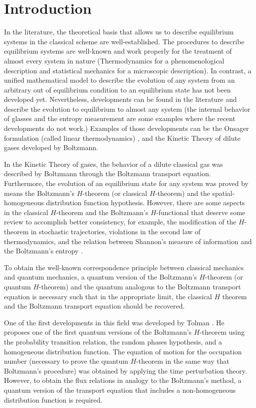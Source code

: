 \section{Introduction}

In the literature, the theoretical basis that allows us to describe equilibrium
systems in the classical scheme are well-established.
The procedures to describe
equilibrium systems are well-known and work properly for the treatment of almost every system in nature
(Thermodynamics for a phenomenological description and statistical mechanics
for a microscopic description). In contrast, a unified mathematical model to
describe the evolution of any system from an arbitrary out of equilibrium condition to an equilibrium state has not been developed yet.
Nevertheless, developments can be found in the literature and describe the
evolution to equilibrium to almost any system (the internal behavior of glasses
\cite{bib:zanotto2018} and the entropy measurement
\cite{bib:schmelzer2018,bib:nemilov2018} are some examples where the recent
developments do not work.) Examples of those developments can be the Onsager
formulation (called linear thermodynamics)
\cite{bib:keizer1987,bib:onsager1931}, and the Kinetic Theory of dilute gases
developed by Boltzmann.

In the Kinetic Theory of gases, the behavior of a dilute classical gas
was described by Boltzmann through the Boltzmann transport equation.
Furthermore, the evolution of an equilibrium state for any system was proved by
means the Boltzmann's $H$-theorem (or classical $H$-theorem) and the
spatial-homogeneous distribution function hypothesis.
However, there are some aspects in the classical $H$-theorem and the
Boltzmann's $H$-functional that deserve some review to accomplish better
consistency, for example, the modification of the $H$-theorem in stochastic
trajectories, violations in the second law of thermodynamics, and the relation
between Shannon's measure of information and the Boltzmann's entropy %
\cite{bib:nemilov2018,bib:keizer1987,bib:onsager1931,bib:brown2008,bib:dragoljub2009}.

To obtain the well-known correspondence principle between classical mechanics
and quantum mechanics, a quantum version of the Boltzmann's $H$-theorem (or
quantum $H$-theorem) and the quantum analogous to the Boltzmann transport
equation is necessary such that in the appropriate limit, the  classical $H$
theorem and the Boltzmann transport equation should be recovered.

One of the first developments in this field was developed by Tolman
\cite{bib:tolman}. He proposes one of the first quantum versions of the
Boltzmann's $H$-theorem using the probability transition relation, the random
phases hypothesis, and a homogeneous distribution function. The equation of
motion for the occupation number (necessary to prove the quantum $H$-theorem in
the same way that Boltzmann's procedure) was obtained by applying the time
perturbation theory. However, to obtain the flux relations in analogy to the
Boltzmann's method, a quantum version of the transport equation that includes a
non-homogeneous distribution function is required.

